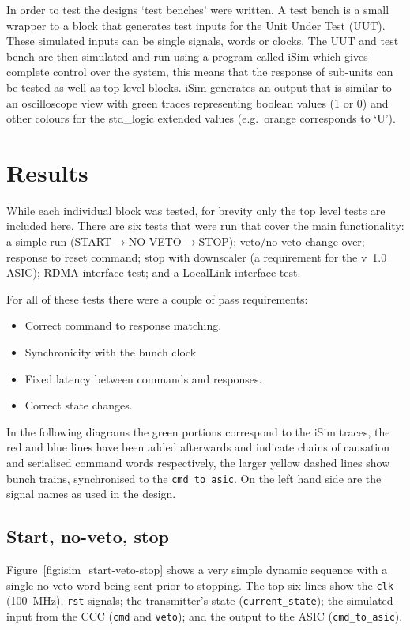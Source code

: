 In order to test the designs `test benches' were written. A test bench is a small wrapper to a block that generates test inputs for the Unit Under Test (UUT). These simulated inputs can be single signals, words or clocks. The UUT and test bench are then simulated and run using a program called iSim which gives complete control over the system, this means that the response of sub-units can be tested as well as top-level blocks. iSim generates an output that is similar to an oscilloscope view with green traces representing boolean values (1 or 0) and other colours for the std\_logic extended values (e.g.\ orange corresponds to `U'). 

\section{Results} %
\label{sec:results}
While each individual block was tested, for brevity only the top level tests are included here. There are six tests that were run that cover the main functionality: a simple run (START\(\rightarrow\)NO-VETO\(\rightarrow\)STOP); veto/no-veto change over; response to reset command; stop with downscaler (a requirement for the v~1.0 ASIC); RDMA interface test; and a LocalLink interface test.

For all of these tests there were a couple of pass requirements:
\begin{itemize}
  \item Correct command to response matching.
  \item Synchronicity with the bunch clock
  \item Fixed latency between commands and responses. 
  \item Correct state changes.
\end{itemize}

In the following diagrams the green portions correspond to the iSim traces, the red and blue lines have been added afterwards and indicate chains of causation and serialised command words respectively, the larger yellow dashed lines show bunch trains, synchronised to the \texttt{cmd\_to\_asic}. On the left hand side are the signal names as used in the design.

\subsection{Start, no-veto, stop} %
\label{sec:start_no_veto_stop}
Figure~\ref{fig:isim_start-veto-stop} shows a very simple dynamic sequence with a single no-veto word being sent prior to stopping. The top six lines show the \texttt{clk} (100~MHz), \texttt{rst} signals; the transmitter's state (\texttt{current\_state}); the simulated input from the CCC (\texttt{cmd} and \texttt{veto}); and the output to the ASIC (\texttt{cmd\_to\_asic}).

